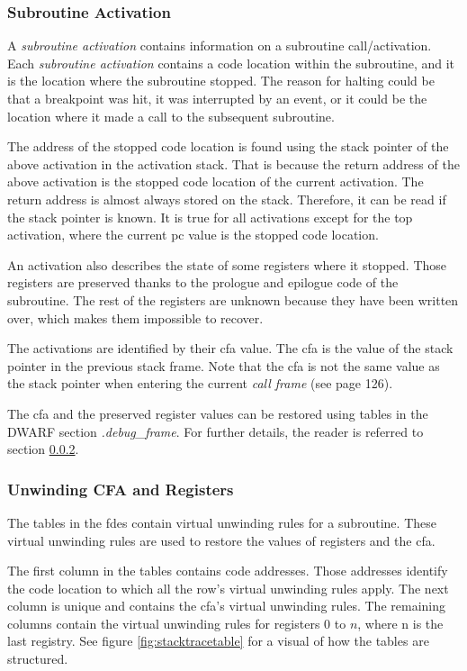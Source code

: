 \subsubsection{Subroutine Activation} \label{sec:subact}
A \emph{subroutine activation} contains information on a subroutine call/activation.
Each \emph{subroutine activation} contains a code location within the subroutine, and it is the location where the subroutine stopped.
The reason for halting could be that a breakpoint was hit, it was interrupted by an event, or it could be the location where it made a call to the subsequent subroutine.


The address of the stopped code location is found using the stack pointer of the above activation in the activation stack.
That is because the return address of the above activation is the stopped code location of the current activation.
The return address is almost always stored on the stack.
Therefore, it can be read if the stack pointer is known.
It is true for all activations except for the top activation, where the current \gls{pc} value is the stopped code location.


An activation also describes the state of some registers where it stopped.
Those registers are preserved thanks to the prologue and epilogue code of the subroutine.
The rest of the registers are unknown because they have been written over, which makes them impossible to recover.


The activations are identified by their \gls{cfa} value.
The \gls{cfa} is the value of the stack pointer in the previous stack frame.
Note that the \gls{cfa} is not the same value as the stack pointer when entering the current \emph{call frame} (see \cite{dwarf} page 126).


The \gls{cfa} and the preserved register values can be restored using tables in the \gls{DWARF} section \emph{.debug\_frame}.
For further details, the reader is referred to section \ref{sec:evalcfa}.



\subsubsection{Unwinding CFA and Registers} \label{sec:evalcfa}
The tables in the \glspl{fde} contain virtual unwinding rules for a subroutine.
These virtual unwinding rules are used to restore the values of registers and the \gls{cfa}.


The first column in the tables contains code addresses.
Those addresses identify the code location to which all the row's virtual unwinding rules apply.
The next column is unique and contains the \gls{cfa}'s virtual unwinding rules. 
The remaining columns contain the virtual unwinding rules for registers $0$ to $n$, where n is the last registry.
See figure \ref{fig:stacktracetable} for a visual of how the tables are structured.


